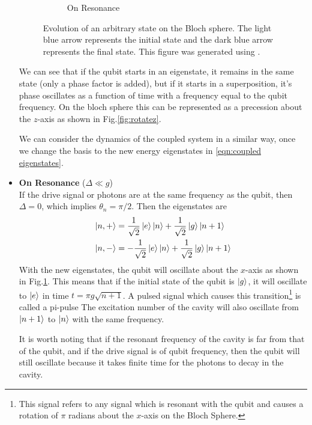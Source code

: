 \begin{itemize}
\begin{figure}
\begin{subfigure}[b]{0.45\textwidth}
\caption{On Resonance}
\label{fig:rotatex}
\end{subfigure}
\decoRule
\caption[Qubit Evolution on Bloch Sphere]{Evolution of an arbitrary state on the Bloch sphere. The light blue arrow represents the initial state and the dark blue arrow represents the final state. This figure was generated using \cite{Johansson2012}.}
\label{fig:rotatexz}
\end{figure}

We can see that if the qubit starts in an eigenstate, it remains in the same state (only a phase factor is added), but if it starts in a superposition, it's phase oscillates as a function of time with a frequency equal to the qubit frequency. On the bloch sphere this can be represented as a precession about the $z$-axis as shown in Fig.\ref{fig:rotatez}.

We can consider the dynamics of the coupled system in a similar way, once we change the basis to the new energy eigenstates in \ref{eqn:coupled eigenstates}.

\item \textbf{On Resonance} ($\Delta\ll g$)\\
If the drive signal or photons are at the same frequency as the qubit, then $\Delta=0$, which implies $\theta_n=\pi/2$. Then the eigenstates are
\begin{subequations}
\label{eqn:delta zero eigenstates}
\begin{align}
\ket{n,+} &= \frac{1}{\sqrt{2}}\ket{e}\ket{n}+\frac{1}{\sqrt{2}}\ket{g}\ket{n+1}\\
\ket{n,-} &= -\frac{1}{\sqrt{2}}\ket{e}\ket{n}+\frac{1}{\sqrt{2}}\ket{g}\ket{n+1}
\end{align}
\end{subequations}
With the new eigenstates, the qubit will oscillate about the $x$-axis as shown in Fig.\ref{fig:rotatex}. This means that if the initial state of the qubit is $\ket{g}$, it will oscillate to $\ket{e}$ in time $t=\pi g\sqrt{n+1}$. A pulsed signal which causes this transition\footnote{This signal refers to any signal which is resonant with the qubit and causes a rotation of $\pi$ radians about the $x$-axis on the Bloch Sphere.} is called a pi-pulse The excitation number of the cavity will also oscillate from $\ket{n+1}$ to $\ket{n}$ with the same frequency.

It is worth noting that if the resonant frequency of the cavity is far from that of the qubit, and if the drive signal is of qubit frequency, then the qubit will still oscillate because it takes finite time for the photons to decay in the cavity.


\end{itemize}
